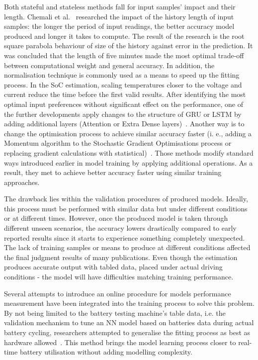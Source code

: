 %
%
Both stateful and stateless methods fall for input samples' impact and their length.
Chemali et al.~\cite{Chemali2017} researched the impact of the history length of input samples: the longer the period of input readings, the better accuracy model produced and longer it takes to compute.
The result of the research is the root square parabola behaviour of size of the history against error in the prediction.
It was concluded that the length of five minutes made the most optimal trade-off between computational weight and general accuracy.
In addition, the normalisation technique is commonly used as a means to speed up the fitting process.
In the SoC estimation, scaling temperatures closer to the voltage and current reduce the time before the first valid results.
After identifying the most optimal input preferences without significant effect on the performance, one of the further developments apply changes to the structure of GRU or LSTM by adding additional layers (Attention or Extra Dense layers)~\cite{mamo_long_2020, jiao_gru-rnn_2020}.
Another way is to change the optimisation process to achieve similar accuracy faster (i. e., adding a Momentum algorithm to the Stochastic Gradient Optimisations process or replacing gradient calculations with statistical)~\cite{xiao_accurate_2019, javid_adaptive_2020}.
Those methods modify standard ways introduced earlier in model training by applying additional operations.
As a result, they met to achieve better accuracy faster using similar training approaches. 

%
%
The drawback lies within the validation procedures of produced models.
Ideally, this process must be performed with similar data but under different conditions or at different times.
However, once the produced model is taken through different unseen scenarios, the accuracy lowers drastically compared to early reported results since it starts to experience something completely unexpected.
The lack of training samples or means to produce at different conditions affected the final judgment results of many publications. 
Even though the estimation produces accurate output with tabled data, placed under actual driving conditions - the model will have difficulties matching training performance. 

%
%
Several attempts to introduce an online procedure for models performance measurement have been integrated into the training process to solve this problem.
By not being limited to the battery testing machine's table data, i.e. the validation mechanism to tune an NN model based on batteries data during actual battery cycling, researchers attempted to generalise the fitting process as best as hardware allowed~\cite{zhang_deep_2020}.
This method brings the model learning process closer to real-time battery utilisation without adding modelling complexity.

